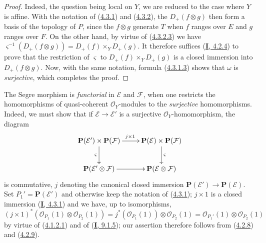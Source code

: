 \begin{proof}
Indeed, the question being local on $Y$, we are reduced to the case where $Y$ is
affine. With the notation of (\hyperref[II.4.3.1]{4.3.1}) and
(\hyperref[II.4.3.2]{4.3.2}), the $D_+(f\otimes g)$ then form a basis
of the topology of $P$, since the $f\otimes g$ generate $T$ when $f$
ranges over $E$ and $g$ ranges over $F$. On the other hand, by virtue of
(\hyperref[II.4.3.2.3]{4.3.2.3}) we have
$\varsigma^{-1}(D_+(f\otimes g))=D_+(f)\times_YD_+(g)$. It therefore suffices
(\hyperref[I.4.2.4]{\textbf{I}, 4.2.4}) to prove that the restriction of
$\varsigma$ to $D_+(f)\times_YD_+(g)$ is a closed immersion into
$D_+(f\otimes g)$. Now, with the same notation, formula
(\hyperref[II.4.3.1.3]{4.3.1.3}) shows that $\omega$ is \emph{surjective}, which
completes the proof.
\end{proof}

\begin{env}[4.3.4]
\label{II.4.3.4}
The Segre morphism is \emph{functorial} in $\mathcal{E}$ and $\mathcal{F}$,
when one restricts the
homomorphisms of quasi-coherent $\mathcal{O}_Y$-modules to the \emph{surjective}
homomorphisms. Indeed, we must show that if
$\mathcal{E}\to\mathcal{E}'$ is a surjective $\mathcal{O}_Y$-homomorphism,
the diagram
\[
  \xymatrix{
    \mathbf{P}(\mathcal{E}')\times\mathbf{P}(\mathcal{F})
      \ar[r]^{j\times1} \ar[d]_{\varsigma}
    & \mathbf{P}(\mathcal{E})\times\mathbf{P}(\mathcal{F})
      \ar[d]^{\varsigma}
    \\\mathbf{P}(\mathcal{E}'\otimes\mathcal{F}) \ar[r]
    & \mathbf{P}(\mathcal{E}\otimes\mathcal{F})
  }
\]
is commutative, $j$ denoting the canonical closed immersion
$\mathbf{P}(\mathcal{E}')\to\mathbf{P}(\mathcal{E})$. Set
$P_1'=\mathbf{P}(\mathcal{E}')$ and otherwise keep the notation of
(\hyperref[II.4.3.1]{4.3.1}); $j\times1$ is a closed immersion
(\hyperref[I.4.3.1]{\textbf{I}, 4.3.1}) and we have, up to isomorphisms,
\[
  (j\times1)^*(\mathcal{O}_{P_1}(1)\otimes\mathcal{O}_{P_2}(1))
  =j^*(\mathcal{O}_{P_1}(1))\otimes\mathcal{O}_{P_2}(1)
  =\mathcal{O}_{P_1'}(1)\otimes\mathcal{O}_{P_2}(1)
\]
by virtue of (\hyperref[II.4.1.2.1]{4.1.2.1}) and of
(\hyperref[I.9.1.5]{\textbf{I}, 9.1.5}); our assertion therefore follows from
(\hyperref[II.4.2.8]{4.2.8}) and
(\hyperref[II.4.2.9]{4.2.9}).
\end{env}

